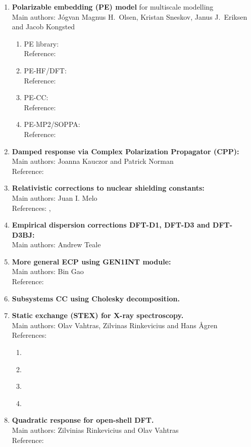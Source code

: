\begin{enumerate}
\item{\bf  Polarizable embedding (PE) model} for multiscale modelling \\
Main authors: J\'{o}gvan Magnus H.\ Olsen, Kristan Sneskov, Janus J.\ Eriksen and Jacob Kongsted
\begin{enumerate}
  \item{PE library:}  \\
   Reference:  \cite{pelib2012}
  \item{PE-HF/DFT:}  \\
   Reference:  \cite{pescf}
  \item{PE-CC:}  \\
   Reference:  \cite{pecc}
  \item{PE-MP2/SOPPA:}  \\
   Reference:  \cite{pesoppa}
\end{enumerate}
\item{\bf  Damped response via Complex Polarization Propagator (CPP):} \\
Main authors: Joanna Kauczor and Patrick Norman \\
Reference:  \cite{kauczor:2011}
\item{\bf  Relativistic corrections to nuclear shielding constants:}  \\
Main authors: Juan I. Melo \\
 References:   \cite{melojcp03},  \cite{melomaldojcp12}
\item{\bf  Empirical dispersion corrections DFT-D1, DFT-D3 and DFT-D3BJ:}  \\
Main authors: Andrew Teale
\item{\bf  More general ECP using GEN1INT module:} \\
Main authors: Bin Gao \\
 Reference:  \cite{gen1int}
\item{\bf  Subsystems CC using Cholesky decomposition.}
\item{\bf  Static exchange (STEX) for X-ray spectroscopy.} \\
Main authors: Olav Vahtras, Zilvinas Rinkevicius and Hans {\AA}gren\\
References:
\begin{enumerate}
\item {}\cite{niskanencppc13}
\item {}\cite{luopra97}
\item {}\cite{vahtrasjpb97}
\item {}\cite{agrencpl94}
\end{enumerate}
\item{\bf  Quadratic response for open-shell DFT.}\\
Main authors: Zilvinias Rinkevicius and Olav Vahtras\\
Reference:
 \cite{rinkeviciusjctc08}
\end{enumerate}

